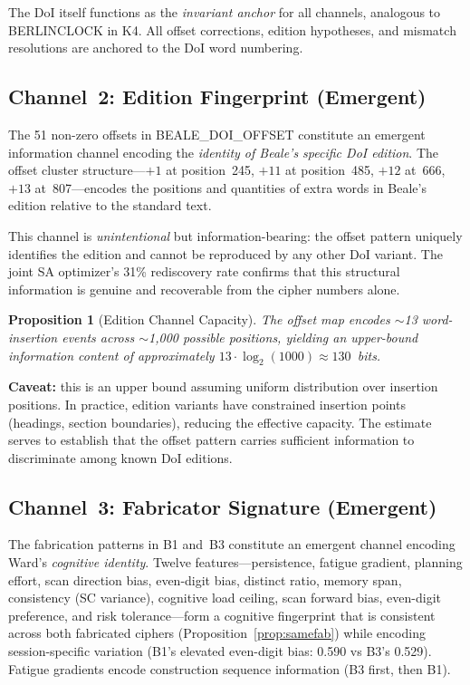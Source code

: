 \documentclass[11pt,a4paper]{article}
\newtheorem{proposition}[theorem]{Proposition}
\begin{document}
The DoI itself functions as the \emph{invariant anchor} for all channels,
analogous to BERLINCLOCK in K4. All offset corrections, edition hypotheses,
and mismatch resolutions are anchored to the DoI word numbering.

\subsection{Channel~2: Edition Fingerprint (Emergent)}

The 51 non-zero offsets in BEALE\_DOI\_OFFSET constitute an emergent
information channel encoding the \emph{identity of Beale's specific DoI
edition}. The offset cluster structure---$+1$ at position~245, $+11$ at
position~485, $+12$ at~666, $+13$ at~807---encodes the positions and
quantities of extra words in Beale's edition relative to the standard text.

This channel is \emph{unintentional} but information-bearing: the offset
pattern uniquely identifies the edition and cannot be reproduced by any
other DoI variant. The joint SA optimizer's 31\% rediscovery rate confirms
that this structural information is genuine and recoverable from the
cipher numbers alone.

\begin{proposition}[Edition Channel Capacity]
\label{prop:editionchannel}
The offset map encodes $\sim$13 word-insertion events across
$\sim$1{,}000 possible positions, yielding an upper-bound information
content of approximately $13 \cdot \log_2(1000) \approx 130$~bits.
\end{proposition}

\noindent\textbf{Caveat:} this is an upper bound assuming uniform
distribution over insertion positions. In practice, edition variants
have constrained insertion points (headings, section boundaries),
reducing the effective capacity. The estimate serves to establish
that the offset pattern carries sufficient information to discriminate
among known DoI editions.

\subsection{Channel~3: Fabricator Signature (Emergent)}

The fabrication patterns in B1 and~B3 constitute an emergent channel
encoding Ward's \emph{cognitive identity}. Twelve features---persistence,
fatigue gradient, planning effort, scan direction bias, even-digit bias,
distinct ratio, memory span, consistency (SC variance), cognitive load ceiling,
scan forward bias, even-digit preference, and risk tolerance---form a
cognitive fingerprint that is consistent across
both fabricated ciphers (Proposition~\ref{prop:samefab}) while encoding
session-specific variation (B1's elevated even-digit bias: 0.590 vs
B3's 0.529). Fatigue gradients encode construction sequence information
(B3 first, then B1).
\end{document}
